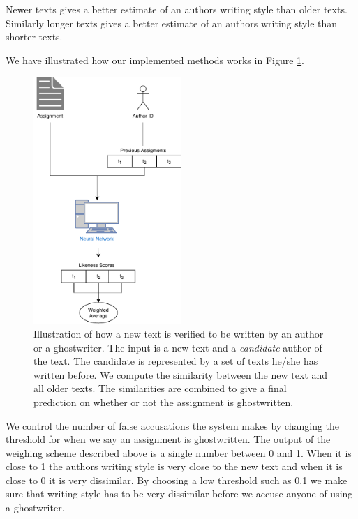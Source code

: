 \documentclass[11pt]{article}
\begin{document}
    Newer texts gives a better estimate of an authors writing style than older
    texts. Similarly longer texts gives a better estimate of an authors writing
    style than shorter texts.

    We have illustrated how our implemented methods works in Figure
    \ref{fig:model}.

    \begin{figure}
        \centering
        \includegraphics[width=0.5\textwidth]{./pictures/Model}
        \caption{Illustration of how a new text is verified to be written by an
            author or a ghostwriter. The input is a new text and a
            \textit{candidate} author of the text. The candidate is represented
            by a set of texts he/she has written before. We compute the
            similarity between the new text and all older texts. The
            similarities are combined to give a final prediction on whether or
            not the assignment is ghostwritten.}
        \label{fig:model}
    \end{figure}

    We control the number of false accusations the system makes by changing the
    threshold for when we say an assignment is ghostwritten. The output of the
    weighing scheme described above is a single number between 0 and 1. When it
    is close to 1 the authors writing style is very close to the new text and
    when it is close to 0 it is very dissimilar. By choosing a low threshold
    such as 0.1 we make sure that writing style has to be very dissimilar before
    we accuse anyone of using a ghostwriter.
\end{document}
